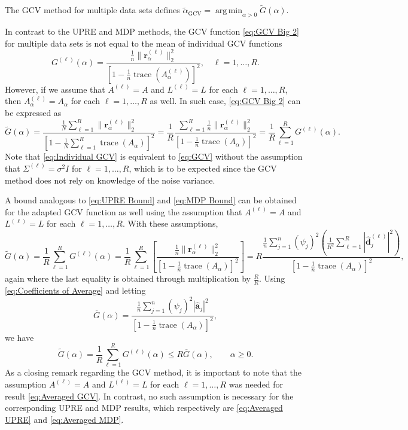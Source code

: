 \documentclass[12pt]{article}
\newcommand{\aVec}{\mathbf{a}}	%
\newcommand{\dVec}{\mathbf{d}}	%
\DeclareMathOperator{\trace}{trace}		%
\newcommand{\dft}[1]{\widehat{#1}}	%
\newcommand{\regparam}{\alpha}
\DeclareMathOperator*{\argmin}{arg\,min}
\newcommand{\mfilt}{\psi}
\newcommand{\noiseSD}{\sigma}	%
\newcommand{\regres}{\mathbf{r}_{\regparam}}	%
\newcommand{\A}{A_{\regparam}}	%
\newcommand{\G}{G}	%
\begin{document}
The GCV method for multiple data sets defines $\widetilde{\regparam}_{\textrm{GCV}} = \argmin_{\regparam > 0} \widetilde{\G}(\regparam)$. \par 
In contrast to the UPRE and MDP methods, the GCV function \eqref{eq:GCV Big 2} for multiple data sets is not equal to the mean of individual GCV functions
\begin{equation}
\label{eq:Individual GCV}
\G^{(\ell)}(\regparam) = \frac{\frac{1}{n}\|\regres^{(\ell)}\|_2^2}{\left[1 - \frac{1}{n}\trace\left(\A^{(\ell)}\right)\right]^2}, \quad \ell = 1,\ldots,R.
\end{equation}
However, if we assume that $A^{(\ell)} = A$ and $L^{(\ell)} = L$ for each $\ell = 1,\ldots,R$, then $\A^{(\ell)} = \A$ for each $\ell = 1,\ldots,R$ as well. In such case, \eqref{eq:GCV Big 2} can be expressed as
\begin{equation}
\label{eq:Averaged GCV}
\widetilde{\G}(\regparam) = \frac{\frac{1}{N}\sum_{\ell=1}^R \|\regres^{(\ell)}\|_2^2}{\left[1 - \frac{1}{N}\sum_{\ell=1}^R \trace\left(\A\right)\right]^2} = \frac{1}{R}\frac{\sum_{\ell=1}^R \frac{1}{n} \|\regres^{(\ell)}\|_2^2}{\left[1 - \frac{1}{n} \trace\left(\A\right)\right]^2} = \frac{1}{R}\sum_{\ell=1}^R \G^{(\ell)}(\regparam).
\end{equation}
Note that \eqref{eq:Individual GCV} is equivalent to \eqref{eq:GCV} without the assumption that $\Sigma^{(\ell)} = \noiseSD^2 I$ for $\ell = 1,\ldots,R$, which is to be expected since the GCV method does not rely on knowledge of the noise variance. \par 
A bound analogous to \eqref{eq:UPRE Bound} and \eqref{eq:MDP Bound} can be obtained for the adapted GCV function as well using the assumption that $A^{(\ell)} = A$ and $L^{(\ell)} = L$ for each $\ell = 1,\ldots,R$. With these assumptions,
\[\widetilde{\G}(\regparam) = \frac{1}{R} \sum_{\ell=1}^R \G^{(\ell)}(\regparam) = \frac{1}{R}\sum_{\ell=1}^R \left[\frac{\frac{1}{n}\|\regres^{(\ell)}\|_2^2}{\left[1 - \frac{1}{n}\trace\left(\A\right)\right]^2}\right]  = R\frac{\frac{1}{n}\sum_{j=1}^{n} \left(\mfilt_j\right)^2\left(\frac{1}{R^2} \sum_{\ell=1}^R |\dft{\dVec}_j^{(\ell)}|^2\right)}{\left[1 - \frac{1}{n}\trace\left(\A\right)\right]^2},\]
again where the last equality is obtained through multiplication by $\frac{R}{R}$. Using \eqref{eq:Coefficients of Average} and letting
\[\overline{\G}(\regparam) = \frac{\frac{1}{n}\sum_{j=1}^{n} \left(\mfilt_j\right)^2|\dft{\aVec}_j|^2}{\left[1 - \frac{1}{n}\trace\left(\A\right)\right]^2},\]
we have
\begin{equation}
\label{eq:GCV Bound}
\widetilde{\G}(\regparam) = \frac{1}{R} \sum_{\ell=1}^R \G^{(\ell)}(\regparam) \leq R \overline{\G}(\regparam), \qquad \regparam \geq 0.
\end{equation}
As a closing remark regarding the GCV method, it is important to note that the assumption $A^{(\ell)} = A$ and $L^{(\ell)} = L$ for each $\ell = 1,\ldots,R$ was needed for result \eqref{eq:Averaged GCV}. In contrast, no such assumption is necessary for the corresponding UPRE and MDP results, which respectively are \eqref{eq:Averaged UPRE} and \eqref{eq:Averaged MDP}.
\end{document}
